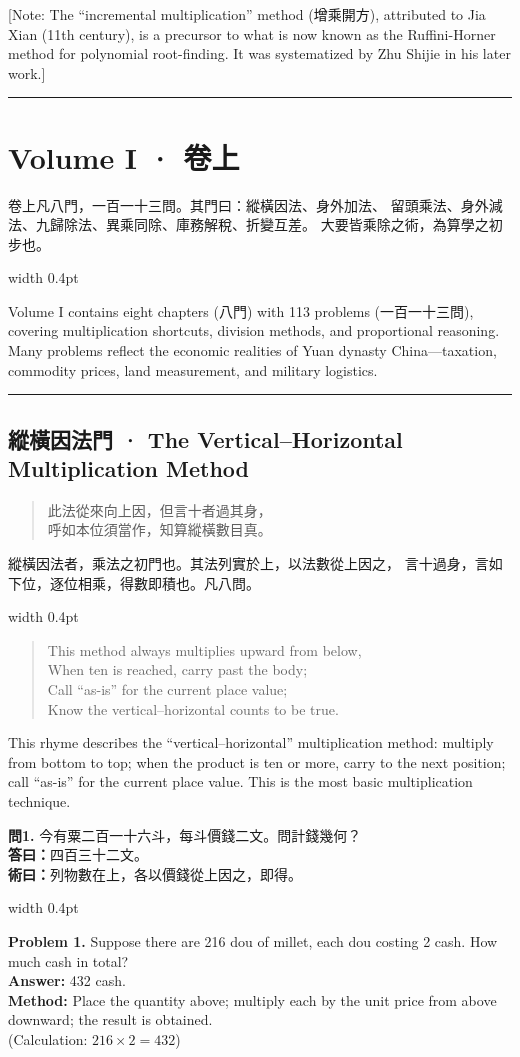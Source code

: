 \documentclass[10pt,a4paper]{article}
\newcommand{\longline}{\noindent\rule{\textwidth}{0.3pt}}
\newlength{\cnwidth}
\newlength{\enwidth}
\newcommand{\bilingual}[2]{%
  \noindent%
  \begin{minipage}[t]{\cnwidth}%
    #1%
  \end{minipage}%
  \hfill\vrule width 0.4pt\hfill%
  \begin{minipage}[t]{\enwidth}%
    #2%
  \end{minipage}%
  \par\smallskip%
}
\newcommand{\bilingualsection}[2]{%
  \section*{#1 · #2}
  \addcontentsline{toc}{section}{#1 · #2}
}
\newcommand{\bilingualsubsection}[2]{%
  \subsection*{#1 · #2}
}
\newenvironment{rhymecn}{%
  \begin{quote}\itshape\color{verselinecolor}
}{\end{quote}}
\newcommand{\transnote}[1]{%
  \par\smallskip\noindent\textcolor{notecolor}{\small[Note: #1]}\par\smallskip
}
\begin{document}
\transnote{The ``incremental multiplication'' method (增乘開方), attributed to Jia Xian
(11th century), is a precursor to what is now known as the Ruffini-Horner method
for polynomial root-finding. It was systematized by Zhu Shijie in his later work.}

\longline


\bilingualsection{Volume I}{卷上}
\label{sec:volume1}

\bilingual{%
  卷上凡八門，一百一十三問。其門曰：縱橫因法、身外加法、
  留頭乘法、身外減法、九歸除法、異乘同除、庫務解稅、折變互差。
  大要皆乘除之術，為算學之初步也。
}{%
  Volume I contains eight chapters (八門) with 113 problems (一百一十三問),
  covering multiplication shortcuts, division methods, and proportional reasoning.
  Many problems reflect the economic realities of Yuan dynasty China---taxation,
  commodity prices, land measurement, and military logistics.
}

\longline

\bilingualsubsection{縱橫因法門}{The Vertical--Horizontal Multiplication Method}
\label{sec:zongheng}

\bilingual{%
  \begin{rhymecn}
  此法從來向上因，但言十者過其身，\\
  呼如本位須當作，知算縱橫數目真。
  \end{rhymecn}
  縱橫因法者，乘法之初門也。其法列實於上，以法數從上因之，
  言十過身，言如下位，逐位相乘，得數即積也。凡八問。
}{%
  \begin{rhymecn}
  This method always multiplies upward from below,\\
  When ten is reached, carry past the body;\\
  Call ``as-is'' for the current place value;\\
  Know the vertical--horizontal counts to be true.
  \end{rhymecn}
  This rhyme describes the ``vertical--horizontal'' multiplication method:
  multiply from bottom to top; when the product is ten or more, carry to the
  next position; call ``as-is'' for the current place value. This is the most
  basic multiplication technique.
}

\bilingual{%
  \textbf{問1.}
  今有粟二百一十六斗，每斗價錢二文。問計錢幾何？\\
  \textbf{答曰：}四百三十二文。\\
  \textbf{術曰：}列物數在上，各以價錢從上因之，即得。
}{%
  \textbf{Problem 1.}
  Suppose there are 216 dou of millet, each dou costing 2 cash.
  How much cash in total?\\
  \textbf{Answer:} 432 cash.\\
  \textbf{Method:} Place the quantity above; multiply each by the unit price
  from above downward; the result is obtained.\\
  (Calculation: $216 \times 2 = 432$)
}
\end{document}
